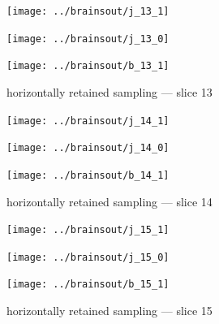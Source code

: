\documentclass{article}
\begin{document}
\begin{figure}
\begin{centering}

\parbox{\imsize}{\texttt{[image: ../brainsout/j\_13\_1]}}

\vspace{\vertsep}

\parbox{\imsize}{\texttt{[image: ../brainsout/j\_13\_0]}}

\vspace{\vertsep}

\parbox{\imsize}{\texttt{[image: ../brainsout/b\_13\_1]}}

\end{centering}
\caption{horizontally retained sampling --- slice 13}
\end{figure}


\begin{figure}
\begin{centering}

\parbox{\imsize}{\texttt{[image: ../brainsout/j\_14\_1]}}

\vspace{\vertsep}

\parbox{\imsize}{\texttt{[image: ../brainsout/j\_14\_0]}}

\vspace{\vertsep}

\parbox{\imsize}{\texttt{[image: ../brainsout/b\_14\_1]}}

\end{centering}
\caption{horizontally retained sampling --- slice 14}
\end{figure}


\begin{figure}
\begin{centering}

\parbox{\imsize}{\texttt{[image: ../brainsout/j\_15\_1]}}

\vspace{\vertsep}

\parbox{\imsize}{\texttt{[image: ../brainsout/j\_15\_0]}}

\vspace{\vertsep}

\parbox{\imsize}{\texttt{[image: ../brainsout/b\_15\_1]}}

\end{centering}
\caption{horizontally retained sampling --- slice 15}
\end{figure}
\end{document}
